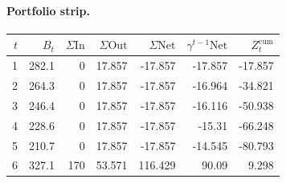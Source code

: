 \documentclass[12pt, a4paper]{article}
\begin{document}
\paragraph{Portfolio strip.}
\begin{center}
\begin{tabular}{rrrrrrr}
\toprule
$t$ & $B_t$ & $\Sigma\mathrm{In}$ & $\Sigma\mathrm{Out}$ & $\Sigma\mathrm{Net}$ & $\gamma^{t-1}\mathrm{Net}$ & $Z_t^{\mathrm{cum}}$\\
\midrule
1 & 282.1 & 0 & 17.857 & -17.857 & -17.857 & -17.857 \\
2 & 264.3 & 0 & 17.857 & -17.857 & -16.964 & -34.821 \\
3 & 246.4 & 0 & 17.857 & -17.857 & -16.116 & -50.938 \\
4 & 228.6 & 0 & 17.857 & -17.857 & -15.31 & -66.248 \\
5 & 210.7 & 0 & 17.857 & -17.857 & -14.545 & -80.793 \\
6 & 327.1 & 170 & 53.571 & 116.429 & 90.09 & 9.298 \\
\bottomrule
\end{tabular}
\end{center}
\end{document}
